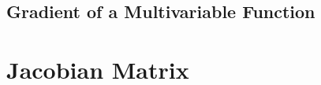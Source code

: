 \subsection{Gradient of a Multivariable Function} \label{ch6subsec:gradientdef}




\section{Jacobian Matrix} \label{ch6sec:jacobianmatrix}
